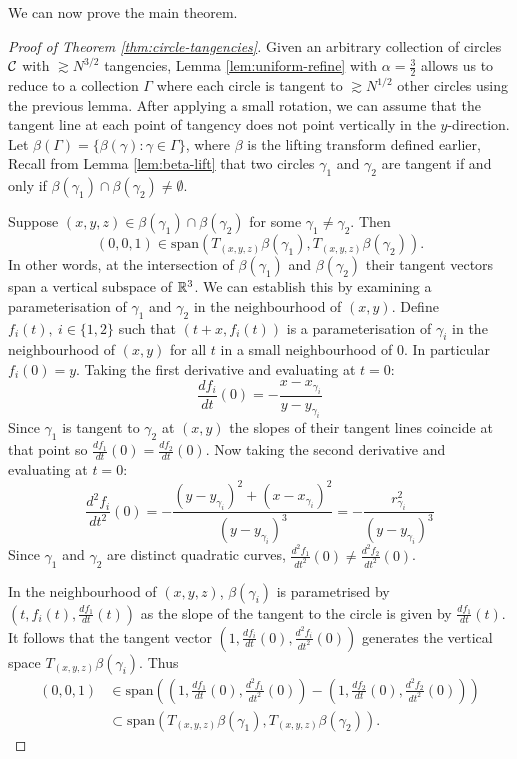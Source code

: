 We can now prove the main theorem. 
\begin{proof}[Proof of Theorem \ref{thm:circle-tangencies}]
    Given an arbitrary collection of circles $\mathcal C$ with $\gtrsim N^{3/2}$ tangencies, Lemma \ref{lem:uniform-refine} with $\alpha = \frac{3}{2}$ 
    allows us to reduce to a collection
     $\Gamma$ where each circle is tangent to  $\gtrsim N^{1/2}$ other circles using the previous lemma. 
    After applying a small rotation, we can assume that the tangent line at each point of tangency does not point vertically in the $y$-direction.
    Let $\beta (\Gamma) = \{ \beta(\gamma) : \gamma \in \Gamma \}$, where $\beta$ is the lifting transform defined earlier,
    Recall from Lemma \ref{lem:beta-lift} that two circles $\gamma_1$ and $\gamma_2$ are tangent if and only if $\beta(\gamma_1) \cap \beta(\gamma_2) \neq \emptyset$.

    Suppose $(x,y,z) \in \beta(\gamma_1) \cap \beta(\gamma_2) $ for some $\gamma_1 \neq \gamma_2$. 
    Then $$(0,0,1) \in \text{span} \left( T_{(x,y,z) }\beta (\gamma_1), T_{(x,y,z) }\beta (\gamma_2)\right).$$
    In other words, at the intersection of $\beta(\gamma_1)$ and $\beta(\gamma_2)$ their tangent vectors span a vertical subspace of $\mathbb R^3$. 
    We can establish this by examining a parameterisation of $\gamma_1$ and $\gamma_2$ in the neighbourhood of $(x,y)$.
    Define $f_i (t), \ i \in \{1,2\}$ such that $(t+x, f_i(t))$ is a parameterisation of $\gamma_i$ in the neighbourhood of $(x,y)$ for all $t$ in a small neighbourhood of 0. In particular $f_i(0) = y$. Taking the first derivative and evaluating at $t=0$:
    \[
        \frac{df_i}{dt}(0) = -\frac{x- x_{\gamma_i}}{y- y_{\gamma_i}}
    \]
    Since $\gamma_1$ is tangent to $\gamma_2$ at $(x,y)$ the slopes of their tangent lines coincide at that point so $\frac{df_1}{dt}(0) = \frac{df_2}{dt}(0)$. Now taking the second derivative and evaluating at $t=0$:
    \[
        \frac{d^2f_i}{dt^2}(0) = -\frac{(y- y_{\gamma_i})^2 + (x- x_{\gamma_i})^2}{(y- y_{\gamma_i})^3} = -\frac{r^2_{\gamma_i}}{(y- y_{\gamma_i})^3} 
    \]
    Since $\gamma_1$ and $\gamma_2$ are distinct quadratic curves, $\frac{d^2f_1}{dt^2}(0) \neq \frac{d^2f_2}{dt^2}(0)$. 



    In the neighbourhood of $(x,y,z)$, $\beta(\gamma_i)$ is parametrised by $\left(t,f_i (t) ,\frac{df_1}{dt}(t) \right)$ as the slope of the tangent to the circle is given by $\frac{df_1}{dt}(t)$.
     It follows that the tangent vector
    $\left(1,\frac{df_i}{dt}(0), \frac{d^2f_i}{dt^2} (0) \right)$ generates the vertical space $T_{(x,y,z)} \beta(\gamma_i)$. Thus 
    \begin{align*} (0,0,1) &\in \text{span}\left( \left(1,\frac{df_1}{dt}(0), \frac{d^2f_1}{dt^2} (0) \right) - \left(1,\frac{df_2}{dt}(0), \frac{d^2f_2}{dt^2} (0) \right) \right)
    \\ &\subset \text{span} \left( T_{(x,y,z) }\beta (\gamma_1), T_{(x,y,z) }\beta (\gamma_2)\right). 
    \end{align*}


\end{proof}
